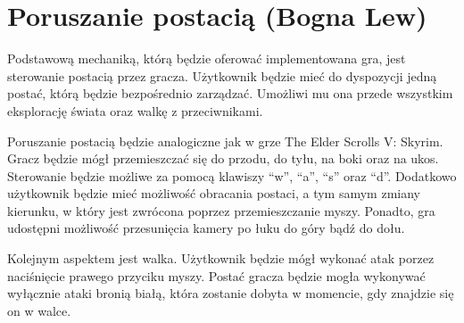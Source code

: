 \section{Poruszanie postacią (Bogna Lew)}
Podstawową mechaniką, którą będzie oferować implementowana gra, jest sterowanie postacią przez gracza. Użytkownik będzie
mieć do dyspozycji jedną postać, którą będzie bezpośrednio zarządzać. Umożliwi mu ona przede wszystkim eksplorację
świata oraz walkę z przeciwnikami.

Poruszanie postacią będzie analogiczne jak w grze The Elder Scrolls V: Skyrim. Gracz będzie mógł przemieszczać się
do przodu, do tyłu, na boki oraz na ukos. Sterowanie będzie możliwe za pomocą klawiszy  “w”, “a”, “s” oraz “d”.
Dodatkowo użytkownik będzie mieć możliwość obracania postaci, a tym samym zmiany kierunku, w który jest zwrócona poprzez
przemieszczanie myszy. Ponadto, gra udostępni możliwość przesunięcia kamery po łuku do góry bądź do dołu.

Kolejnym aspektem jest walka. Użytkownik będzie mógł wykonać atak porzez naciśnięcie prawego przyciku myszy. Postać
gracza będzie mogła wykonywać wyłącznie ataki bronią białą, która zostanie dobyta w momencie, gdy znajdzie się on w walce.